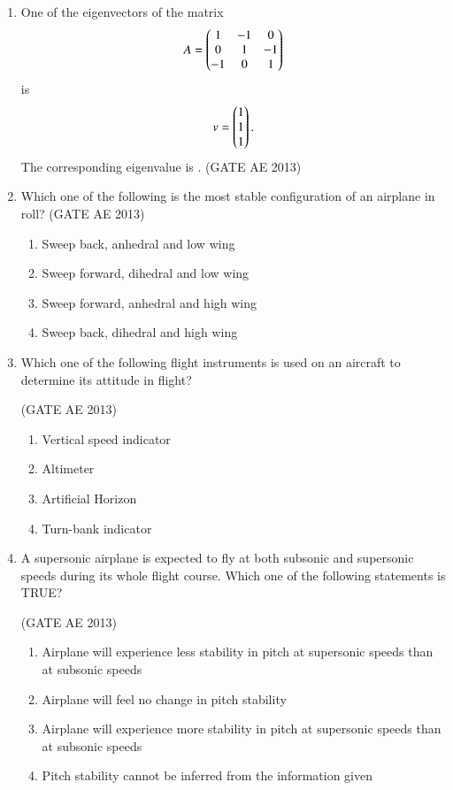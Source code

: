 \documentclass[journal,12pt,onecolumn]{IEEEtran}
\theoremstyle{remark}
\begin{document}
\begin{flushleft}
\begin{enumerate}
\item One of the eigenvectors of the matrix
\[
A = \begin{pmatrix}1 & -1 & 0 \\ 0 & 1 & -1 \\ -1 & 0 & 1\end{pmatrix}
\]
is 
\[
v = \begin{pmatrix}1 \\ 1 \\ 1\end{pmatrix}.
\]
The corresponding eigenvalue is \underline{\hspace{3cm}}.
\hfill(GATE AE 2013)

\item Which one of the following is the most stable configuration of an airplane in roll?
\hfill(GATE AE 2013)

\begin{enumerate}
    \item Sweep back, anhedral and low wing
    \item Sweep forward, dihedral and low wing
    \item Sweep forward, anhedral and high wing
    \item Sweep back, dihedral and high wing
\end{enumerate}

\item Which one of the following flight instruments is used on an aircraft to determine its attitude in flight? \underline{\hspace{3cm}}

\hfill(GATE AE 2013)

\begin{multicols}{2}
\begin{enumerate}
    \item Vertical speed indicator
    \item Altimeter
    \item Artificial Horizon
    \item Turn-bank indicator
\end{enumerate}
\end{multicols}

\item A supersonic airplane is expected to fly at both subsonic and supersonic speeds during its whole flight course. Which one of the following statements is TRUE? \underline{\hspace{3cm}}

\hfill(GATE AE 2013)

\begin{enumerate}
    \item Airplane will experience less stability in pitch at supersonic speeds than at subsonic speeds
    \item Airplane will feel no change in pitch stability
    \item Airplane will experience more stability in pitch at supersonic speeds than at subsonic speeds
    \item Pitch stability cannot be inferred from the information given
\end{enumerate}


\end{enumerate}
\end{flushleft}
\end{document}

